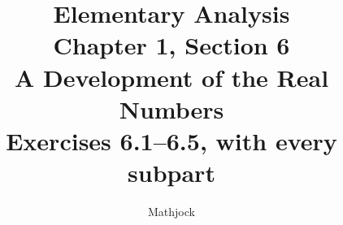 
\title{\textbf{Elementary Analysis}\\[0.3em]
Chapter 1, Section 6\\[0.3em]
\large A Development of the Real Numbers\\
Exercises 6.1--6.5, with every subpart}
\author{Mathjock}
\date{}

\maketitle
\bookinfo
\tableofcontents
\clearpage
\setcounter{section}{5}


